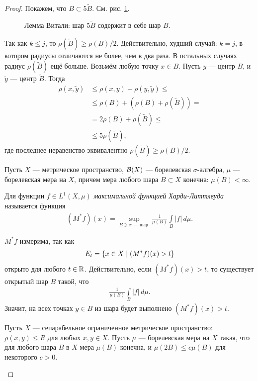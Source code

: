 \begin{proof}
Покажем, что $B \subset 5\tilde B$. См. рис. \ref{fig:vitali-lemma-intersecting-balls}.

\begin{figure}[ht]
    \centering
    \caption{Лемма Витали: шар $5 \tilde B$ содержит в себе шар $B$.}
    \label{fig:vitali-lemma-intersecting-balls}
\end{figure}

Так как $k \leqslant j$, то $\rho(\tilde B) \geqslant \rho(B)/2$. Действительно, худший случай: $k = j$, в котором радиусы отличаются не более, чем в два раза. В остальных случаях радиус $\rho(\tilde B)$ ещё больше. Возьмём любую точку $x \in B$. Пусть $y$ --- центр $B$, и $\tilde y$ --- центр $\tilde B$. Тогда \begin{align*}
 \rho(x, \tilde y) &\leqslant \rho(x, y) + \rho(y, \tilde y) \leqslant \\ & \leqslant \rho(B) + (\rho(B) + \rho(\tilde B)) = \\ &= 2\rho(B) + \rho(\tilde B) \leqslant \\ &\leqslant 5 \rho(\tilde B)
,\end{align*} где последнее неравенство эквивалентно $\rho(\tilde B) \geqslant \rho(B) / 2$.

\begin{df}
 Пусть $X$ --- метрическое пространство, $\mathcal{B}(X)$ --- борелевская $\sigma$-алгебра, $\mu$ --- борелевская мера на $X$, причем мера любого шара $B \subset X$ конечна: $\mu(B) < \infty$.

 Для функции $f \in L^{1}(X, \mu)$ \textit{максимальной функцией Харди-Литтлвуда} называется функция
\begin{align*}
 (M^{\ast}f)(x) = \sup_{B \ni x \text{ --- шар }} \frac{1}{\mu(B)} \int\limits_{B} \left| f \right| \, d\mu  
.\end{align*}
\end{df}
\begin{remrk}
 $M^{\ast}f$ измерима, так как \begin{align*}
  E_t = \left\{ x \in X \;\middle|\; (M^{\ast} f)(x) > t \right\} 
 \end{align*} открыто для любого $t \in \mathbb{R}$. Действительно, если $(M^{\ast}f)(x) > t$, то существует открытый шар $B$ такой, что \begin{align*}
  \frac{1}{\mu(B)} \int\limits_{B} \left| f \right| \, d\mu
 .\end{align*} Значит, на всех точках $y \in B$ из шара будет выполнено $(M^{\ast}f)(x) > t$.
\end{remrk}
\begin{thm}
\label{theorem:hardy_littlewood}
 Пусть $X$ --- сепарабельное ограниченное метрическое пространство: $\rho(x, y) \leqslant R$ для любых $x,y \in X$. Пусть $\mu$ --- борелевская мера на $X$ такая, что для любого шара $B$ в $X$ мера $\mu(B)$ конечна, и $\mu(2B) \leqslant c \mu(B)$ для некоторого $c > 0$.


\end{thm}
\end{proof}
